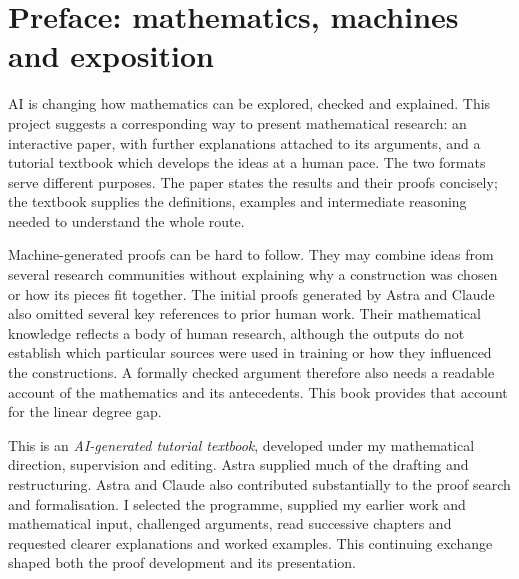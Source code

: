 \chapter*{Preface: mathematics, machines and exposition}
\label{tx:preface:provenance}
\begingroup\fontsize{10.5}{12.6}\selectfont
AI is changing how mathematics can be explored, checked and explained.
This project suggests a corresponding way to present mathematical research:
an interactive paper, with further explanations attached to its arguments,
and a tutorial textbook which develops the ideas at a human pace.
The two formats serve different purposes. The paper states the results
and their proofs concisely; the textbook supplies the definitions,
examples and intermediate reasoning needed to understand the whole route.

Machine-generated proofs can be hard to follow. They may combine ideas
from several research communities without explaining why a construction
was chosen or how its pieces fit together. The initial proofs generated
by Astra and Claude also omitted several key references to prior human
work. Their mathematical knowledge reflects a body of human research,
although the outputs do not establish which particular sources were
used in training or how they influenced the constructions. A formally
checked argument therefore also needs a readable account of the
mathematics and its antecedents. This book provides that account for
the linear degree gap.

This is an \emph{AI-generated tutorial textbook}, developed under my
mathematical direction, supervision and editing. Astra supplied much of
the drafting and restructuring. Astra and Claude also contributed
substantially to the proof search and formalisation. I selected the
programme, supplied my earlier work and mathematical input, challenged
arguments, read successive chapters and requested clearer explanations
and worked examples. This continuing exchange shaped both the proof
development and its presentation.

